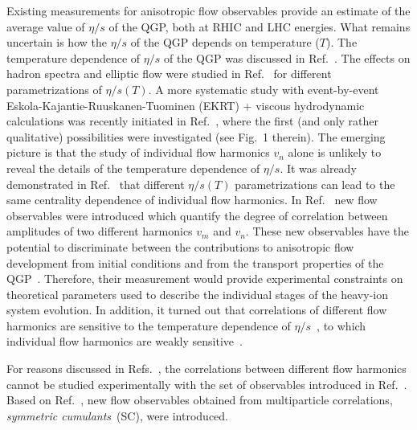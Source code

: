 Existing measurements for anisotropic flow observables provide an estimate of the average value of $\eta/s$ of the QGP, both at RHIC and LHC energies. What remains uncertain is how the $\eta/s$ of the QGP depends on temperature ($T$). The temperature dependence of $\eta/s$ of the QGP was discussed in Ref.~\cite{Csernai:2006zz}. The effects on hadron spectra and elliptic flow were studied in Ref.~\cite{Niemi:2011ix} for different parametrizations of $\eta/s(T)$.  A more systematic study with event-by-event Eskola-Kajantie-Ruuskanen-Tuominen (EKRT) + viscous hydrodynamic calculations was recently initiated in Ref.~\cite{Niemi:2015qia}, where the first (and only rather qualitative) possibilities were investigated (see Fig.~1 therein). The emerging picture is that the study of individual flow harmonics $v_n$ alone is unlikely to reveal the details of the temperature dependence of $\eta/s$.
It was already demonstrated in Ref.~\cite{Niemi:2015qia} that different $\eta/s(T)$ parametrizations can lead to the same centrality dependence of individual flow harmonics. In Ref.~\cite{Niemi:2012aj} new flow observables were introduced which quantify the degree of correlation between amplitudes of two different harmonics $v_m$ and $v_n$. These new observables have the potential to discriminate between the contributions to anisotropic flow development from initial conditions and from the transport properties of the QGP~\cite{Niemi:2012aj}. Therefore, their measurement would provide experimental constraints on theoretical parameters used to describe the individual stages of the heavy-ion system evolution. In addition, it turned out that correlations of different flow harmonics are sensitive to the temperature dependence of $\eta/s$~\cite{ALICE:2016kpq}, to which individual flow harmonics are weakly sensitive~\cite{Niemi:2015qia}. 
 
For reasons discussed in Refs.~\cite{ALICE:2016kpq,Bilandzic:2013kga}, the correlations between different flow harmonics cannot be studied experimentally with the set of observables introduced in Ref.~\cite{Niemi:2012aj}. 
Based on Ref.~\cite{Bilandzic:2013kga}, new flow observables obtained from multiparticle correlations, \textit{symmetric cumulants}~(SC), were introduced. 

